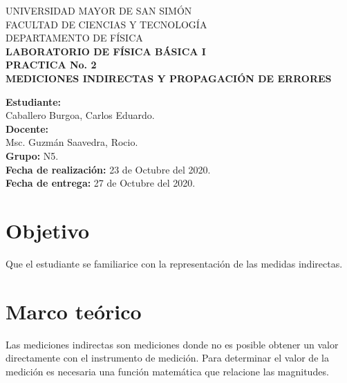 \documentclass[letter,11pt]{article}
\newcommand{\blankpage}{
\newpage
\thispagestyle{empty}
\mbox{}
\newpage
}
\begin{document}
\begin{titlepage}
\begin{center}
{\Large UNIVERSIDAD MAYOR DE SAN SIMÓN}\\
\vspace*{0.15cm}
{\large FACULTAD DE CIENCIAS Y TECNOLOGÍA}\\
\vspace*{0.10cm}
DEPARTAMENTO DE FÍSICA\\
\vspace*{3.0cm}
{\Large \textbf{LABORATORIO DE FÍSICA BÁSICA I}}\\
\vspace*{0.3cm}
{\Large \textbf{PRACTICA No. 2}}\\
\vspace*{3.5cm}
{\Large \textbf{MEDICIONES INDIRECTAS Y PROPAGACIÓN DE ERRORES}}\\
\end{center}

\vspace*{6.9cm}
\leftskip=7.95cm
\noindent
\textbf{Estudiante:}\\
Caballero Burgoa, Carlos Eduardo.\\
\newline
\textbf{Docente:}\\
Msc. Guzmán Saavedra, Rocio.\\
\newline
\textbf{Grupo:} N5.\\
\textbf{Fecha de realización:} 23 de Octubre del 2020.\\
\textbf{Fecha de entrega:} 27 de Octubre del 2020.\\

\end{titlepage}

\blankpage

\section{Objetivo}
Que el estudiante se familiarice con la representación de las medidas
indirectas.

\section{Marco teórico}
Las mediciones indirectas son mediciones donde no es posible obtener un valor
directamente con el instrumento de medición. Para determinar el valor de la
medición es necesaria una función matemática que relacione las magnitudes.
\end{document}
